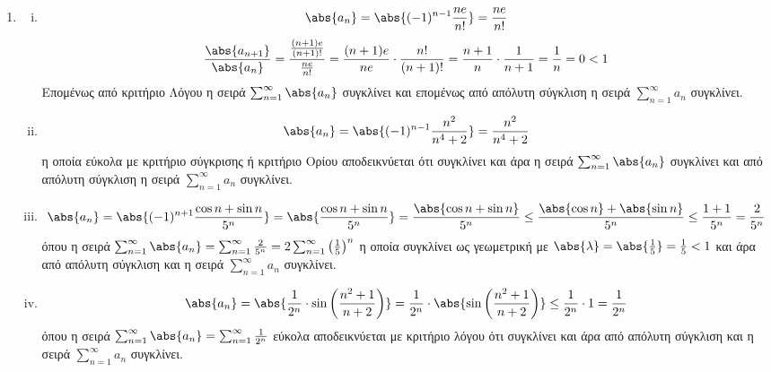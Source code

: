 \begin{enumerate}
\item 
    \begin{enumerate}[i)]
        \item 
            \[
                \abs{a_{n}} = \abs{(-1)^{n-1} \frac{ne}{n!}} = \frac{ne}{n!}
             \] 
             \[
                 \frac{\abs{a_{n+1}}}{\abs{a_{n}}} = \frac{\frac{(n+1)e}{(n+1)!}}
                 {\frac{ne}{n!}} = \frac{(n+1)e}{ne} \cdot \frac{n!}{(n+1)!} = 
                 \frac{n+1}{n} \cdot \frac{1}{n+1} = \frac{1}{n} = 0<1
              \] 
              Επομένως από κριτήριο Λόγου η σειρά $ \sum_{n=1}^{\infty} \abs{a_{n}} $ 
              συγκλίνει και επομένως από απόλυτη σύγκλιση η σειρά 
              $ \sum_{n=1}^{\infty} a_{n} $ συγκλίνει.

          \item 
              \[
                  \abs{a_{n}} = \abs{(-1)^{n-1} \frac{n^{2}}{n^{4}+2}} = 
                  \frac{n^{2}}{n^{4}+2}  
               \] 
               η οποία εύκολα με κριτήριο σύγκρισης ή κριτήριο Ορίου αποδεικνύεται ότι 
               συγκλίνει και άρα η σειρά $ \sum_{n=1}^{\infty} \abs{a_{n}} $ συγκλίνει
               και από απόλυτη σύγκλιση η σειρά $ \sum_{n=1}^{\infty} a_{n} $ συγκλίνει.

           \item 
               \[
                   \abs{a_{n}} = \abs{(-1)^{n+1} \frac{\cos{n} + \sin{n}}{5^{n}}} = 
                   \abs{\frac{\cos{n} + \sin{n}}{5^{n}}} = 
                   \frac{\abs{\cos{n} + \sin{n}}}{5^{n}}
                   \leq \frac{\abs{\cos{n}} + \abs{\sin{n}}}{5^{n}} 
                   \leq \frac{1+1}{5^{n}} = \frac{2}{5^{n}}  
                \] 
                όπου η σειρά $ \sum_{n=1}^{\infty} \abs{a_{n}} = \sum_{n=1}^{\infty} 
                \frac{2}{5^{n}} = 2 \sum_{n=1}^{\infty} \left(\frac{1}{5} \right)^{n} $
                η οποία συγκλίνει ως γεωμετρική με 
                $ \abs{\lambda} = \abs{\frac{1}{5}} = \frac{1}{ 5} <1 $ και άρα από 
                απόλυτη σύγκλιση και η σειρά $ \sum_{n=1}^{\infty} a_{n} $ συγκλίνει.

            \item 
                \[
                    \abs{a_{n}} = \abs{\frac{1}{2^{n}} \cdot 
                    \sin{\left(\frac{n^{2}+1}{n+2}\right)}} =
                    \frac{1}{2^{n}} \cdot \abs{\sin{\left(\frac{n^{2}+1}{n+2}\right)}} 
                    \leq \frac{1}{2^{n}} \cdot 1 = \frac{1}{2^{n}}
                 \] 
                 όπου η σειρά $ \sum_{n=1}^{\infty} \abs{a_{n}} = 
                 \sum_{n=1}^{\infty} \frac{1}{2^{n}}  $ εύκολα αποδεικνύεται με 
                 κριτήριο λόγου ότι συγκλίνει και άρα από απόλυτη σύγκλιση και η σειρά
                 $ \sum_{n=1}^{\infty} a_{n} $ συγκλίνει.
    \end{enumerate}
\end{enumerate}




